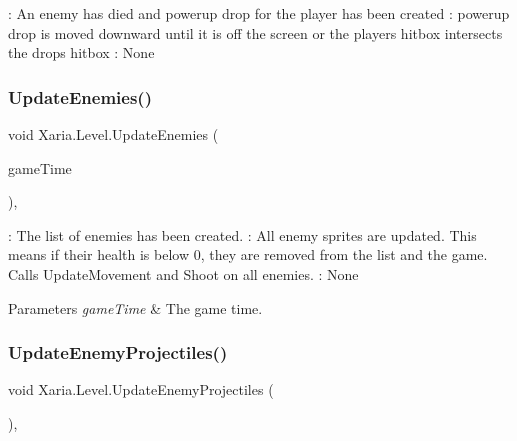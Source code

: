 \+: An enemy has died and powerup drop for the player has been created \+: powerup drop is moved downward until it is off the screen or the player\textquotesingle{}s hitbox intersects the drops hitbox \+: None 

\mbox{\label{classXaria_1_1Level_a46a7b08381a882d95321d41f0ab7537f}} 
\subsubsection{\texorpdfstring{Update\+Enemies()}{UpdateEnemies()}}
{\footnotesize\ttfamily void Xaria.\+Level.\+Update\+Enemies (\begin{DoxyParamCaption}\item[{Game\+Time}]{game\+Time }\end{DoxyParamCaption})\hspace{0.3cm}{\ttfamily [inline]}, {\ttfamily [private]}}



\+: The list of enemies has been created. \+: All enemy sprites are updated. This means if their health is below 0, they are removed from the list and the game. Calls Update\+Movement and Shoot on all enemies. \+: None 


\begin{DoxyParams}{Parameters}
{\em game\+Time} & The game time.\\
\hline
\end{DoxyParams}
\mbox{\label{classXaria_1_1Level_a9c32c2aeebc7fefe181b142fe03cae78}} 
\subsubsection{\texorpdfstring{Update\+Enemy\+Projectiles()}{UpdateEnemyProjectiles()}}
{\footnotesize\ttfamily void Xaria.\+Level.\+Update\+Enemy\+Projectiles (\begin{DoxyParamCaption}{ }\end{DoxyParamCaption})\hspace{0.3cm}{\ttfamily [inline]}, {\ttfamily [private]}}



